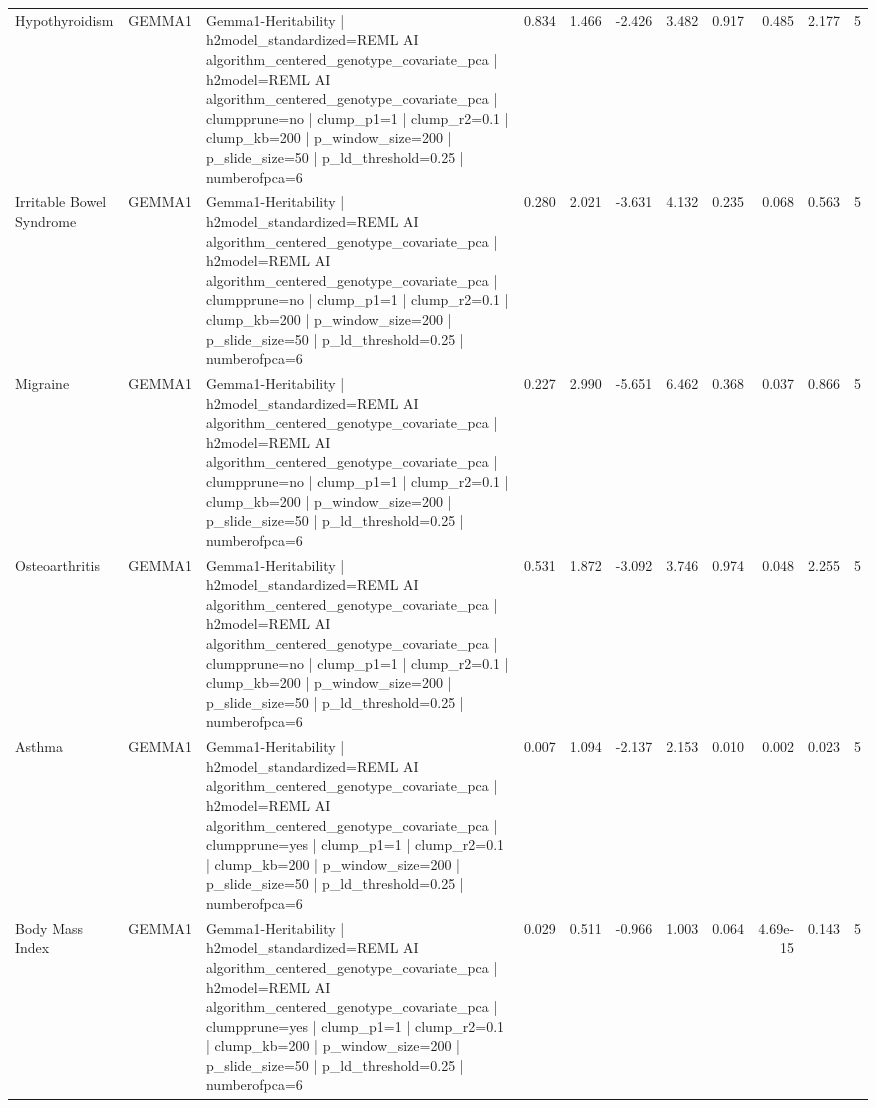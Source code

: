 \begin{landscape}
\begin{longtable}{p{2.4cm}p{1.8cm}p{6.0cm}rrrrrrrr}
Hypothyroidism & GEMMA1 & Gemma1-Heritability | h2model\_standardized=REML AI algorithm\_centered\_genotype\_covariate\_pca | h2model=REML AI algorithm\_centered\_genotype\_covariate\_pca | clumpprune=no | clump\_p1=1 | clump\_r2=0.1 | clump\_kb=200 | p\_window\_size=200 | p\_slide\_size=50 | p\_ld\_threshold=0.25 | numberofpca=6 & 0.834 & 1.466 & -2.426 & 3.482 & 0.917 & 0.485 & 2.177 & 5 \\
Irritable Bowel Syndrome & GEMMA1 & Gemma1-Heritability | h2model\_standardized=REML AI algorithm\_centered\_genotype\_covariate\_pca | h2model=REML AI algorithm\_centered\_genotype\_covariate\_pca | clumpprune=no | clump\_p1=1 | clump\_r2=0.1 | clump\_kb=200 | p\_window\_size=200 | p\_slide\_size=50 | p\_ld\_threshold=0.25 | numberofpca=6 & 0.280 & 2.021 & -3.631 & 4.132 & 0.235 & 0.068 & 0.563 & 5 \\
Migraine & GEMMA1 & Gemma1-Heritability | h2model\_standardized=REML AI algorithm\_centered\_genotype\_covariate\_pca | h2model=REML AI algorithm\_centered\_genotype\_covariate\_pca | clumpprune=no | clump\_p1=1 | clump\_r2=0.1 | clump\_kb=200 | p\_window\_size=200 | p\_slide\_size=50 | p\_ld\_threshold=0.25 | numberofpca=6 & 0.227 & 2.990 & -5.651 & 6.462 & 0.368 & 0.037 & 0.866 & 5 \\
Osteoarthritis & GEMMA1 & Gemma1-Heritability | h2model\_standardized=REML AI algorithm\_centered\_genotype\_covariate\_pca | h2model=REML AI algorithm\_centered\_genotype\_covariate\_pca | clumpprune=no | clump\_p1=1 | clump\_r2=0.1 | clump\_kb=200 | p\_window\_size=200 | p\_slide\_size=50 | p\_ld\_threshold=0.25 | numberofpca=6 & 0.531 & 1.872 & -3.092 & 3.746 & 0.974 & 0.048 & 2.255 & 5 \\
Asthma & GEMMA1 & Gemma1-Heritability | h2model\_standardized=REML AI algorithm\_centered\_genotype\_covariate\_pca | h2model=REML AI algorithm\_centered\_genotype\_covariate\_pca | clumpprune=yes | clump\_p1=1 | clump\_r2=0.1 | clump\_kb=200 | p\_window\_size=200 | p\_slide\_size=50 | p\_ld\_threshold=0.25 | numberofpca=6 & 0.007 & 1.094 & -2.137 & 2.153 & 0.010 & 0.002 & 0.023 & 5 \\
Body Mass Index & GEMMA1 & Gemma1-Heritability | h2model\_standardized=REML AI algorithm\_centered\_genotype\_covariate\_pca | h2model=REML AI algorithm\_centered\_genotype\_covariate\_pca | clumpprune=yes | clump\_p1=1 | clump\_r2=0.1 | clump\_kb=200 | p\_window\_size=200 | p\_slide\_size=50 | p\_ld\_threshold=0.25 | numberofpca=6 & 0.029 & 0.511 & -0.966 & 1.003 & 0.064 & 4.69e-15 & 0.143 & 5 \\

\end{longtable}
\end{landscape}
